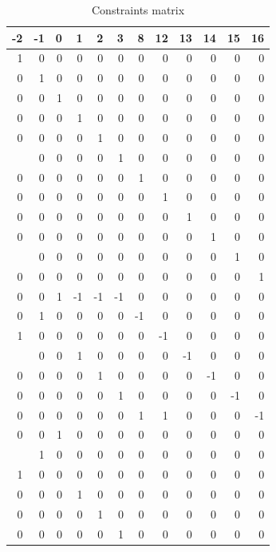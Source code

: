 \documentclass[]{article}
\begin{document}
\begin{table}
\caption{\label{tab:unnamed-chunk-16}Constraints matrix}

\centering
\begin{tabular}[t]{rrrrrrrrrrrr}
\toprule
-2 & -1 & 0 & 1 & 2 & 3 & 8 & 12 & 13 & 14 & 15 & 16\\
\midrule
1 & 0 & 0 & 0 & 0 & 0 & 0 & 0 & 0 & 0 & 0 & 0\\
0 & 1 & 0 & 0 & 0 & 0 & 0 & 0 & 0 & 0 & 0 & 0\\
0 & 0 & 1 & 0 & 0 & 0 & 0 & 0 & 0 & 0 & 0 & 0\\
0 & 0 & 0 & 1 & 0 & 0 & 0 & 0 & 0 & 0 & 0 & 0\\
0 & 0 & 0 & 0 & 1 & 0 & 0 & 0 & 0 & 0 & 0 & 0\\
\addlinespace
0 & 0 & 0 & 0 & 0 & 1 & 0 & 0 & 0 & 0 & 0 & 0\\
0 & 0 & 0 & 0 & 0 & 0 & 1 & 0 & 0 & 0 & 0 & 0\\
0 & 0 & 0 & 0 & 0 & 0 & 0 & 1 & 0 & 0 & 0 & 0\\
0 & 0 & 0 & 0 & 0 & 0 & 0 & 0 & 1 & 0 & 0 & 0\\
0 & 0 & 0 & 0 & 0 & 0 & 0 & 0 & 0 & 1 & 0 & 0\\
\addlinespace
0 & 0 & 0 & 0 & 0 & 0 & 0 & 0 & 0 & 0 & 1 & 0\\
0 & 0 & 0 & 0 & 0 & 0 & 0 & 0 & 0 & 0 & 0 & 1\\
0 & 0 & 1 & -1 & -1 & -1 & 0 & 0 & 0 & 0 & 0 & 0\\
0 & 1 & 0 & 0 & 0 & 0 & -1 & 0 & 0 & 0 & 0 & 0\\
1 & 0 & 0 & 0 & 0 & 0 & 0 & -1 & 0 & 0 & 0 & 0\\
\addlinespace
0 & 0 & 0 & 1 & 0 & 0 & 0 & 0 & -1 & 0 & 0 & 0\\
0 & 0 & 0 & 0 & 1 & 0 & 0 & 0 & 0 & -1 & 0 & 0\\
0 & 0 & 0 & 0 & 0 & 1 & 0 & 0 & 0 & 0 & -1 & 0\\
0 & 0 & 0 & 0 & 0 & 0 & 1 & 1 & 0 & 0 & 0 & -1\\
0 & 0 & 1 & 0 & 0 & 0 & 0 & 0 & 0 & 0 & 0 & 0\\
\addlinespace
0 & 1 & 0 & 0 & 0 & 0 & 0 & 0 & 0 & 0 & 0 & 0\\
1 & 0 & 0 & 0 & 0 & 0 & 0 & 0 & 0 & 0 & 0 & 0\\
0 & 0 & 0 & 1 & 0 & 0 & 0 & 0 & 0 & 0 & 0 & 0\\
0 & 0 & 0 & 0 & 1 & 0 & 0 & 0 & 0 & 0 & 0 & 0\\
0 & 0 & 0 & 0 & 0 & 1 & 0 & 0 & 0 & 0 & 0 & 0\\

\end{tabular}
\end{table}
\end{document}
